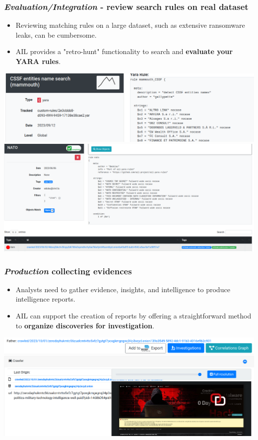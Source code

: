 \documentclass{beamer}
\begin{document}
\begin{frame}
    \frametitle{{\it Evaluation/Integration} - review search rules on real dataset}
    \begin{itemize}
        \item Reviewing matching rules on a large dataset, such as extensive ransomware leaks, can be cumbersome.
        \item AIL provides a "retro-hunt" functionality to search and {\bf evaluate your YARA rules}.
    \end{itemize}
    \begin{center}
      \includegraphics[scale=0.20]{images/ail-yara.png}
      \includegraphics[scale=0.15]{images/ail-yara-retrohunt.png}
    \end{center}
\end{frame}

\begin{frame}
    \frametitle{{\it Production} collecting evidences}
	\begin{itemize}
		\item Analysts need to gather evidence, insights, and intelligence to produce intelligence reports.
        \item AIL can support the creation of reports by offering a straightforward method to {\bf organize discoveries for investigation}.
	\end{itemize}
    \begin{center}
       \includegraphics[scale=0.15]{images/ail-investigation-2.png}
    \end{center}
\end{frame}
\end{document}
